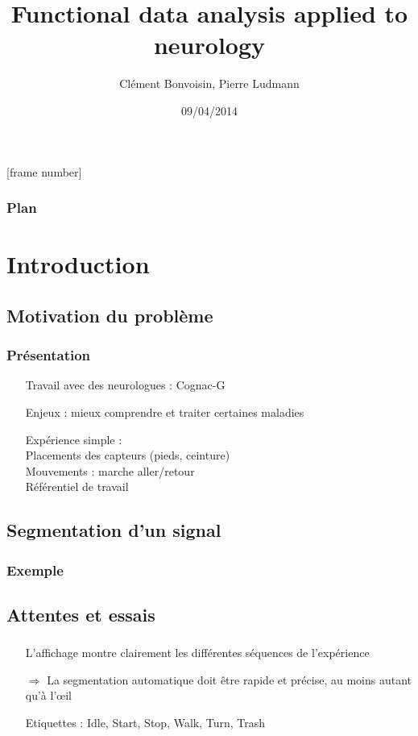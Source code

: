 \documentclass{beamer}
\title[Signal segmentation]{Functional data analysis applied to neurology}
\author{Clément Bonvoisin, Pierre Ludmann}
\institute{CMLA (ENS Cachan), Cognac-G (Paris V)}
\date{09/04/2014}
\begin{document}
[frame number]

\begin{frame}
\titlepage
\end{frame}

\begin{frame}
\frametitle{Plan}
  \tableofcontents[hideallsubsections]
\end{frame}


\section{Introduction}
\subsection{Motivation du problème}
\begin{frame}
	\frametitle{Présentation}
	\begin{itemize}
		\item[Travail] avec des neurologues : Cognac-G
		\item[Enjeux :] mieux comprendre et traiter certaines maladies
		\item[Expérience] simple :
			\\ Placements des capteurs (pieds, ceinture)
			\\ Mouvements : marche aller/retour
			\\ Référentiel de travail
	\end{itemize}	
\end{frame}

\subsection{Segmentation d'un signal}
\begin{frame}
	\frametitle{Exemple}
\end{frame}
\subsection{Attentes et essais}

\begin{frame}
	\frametitle{}
	\begin{itemize}
		\item[L'affichage] montre clairement les différentes séquences de l'expérience
		\item[$\Longrightarrow$] La segmentation automatique doit être rapide et précise, au moins autant qu'à l'œil
		
		\item[Etiquettes]: Idle, Start, Stop, Walk, Turn, Trash
		
	\end{itemize}
\end{frame}
\end{document}
